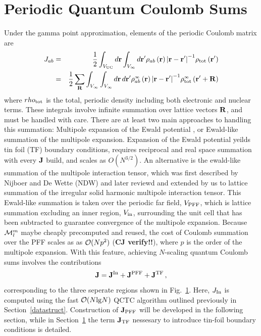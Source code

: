 \commentoutA{\documentclass[prb,aps,twocolumn,showpacs,twocolumngrid,superbib]{revtex4}}
\begin{document}
\section{Periodic Quantum Coulomb Sums}

Under the gamma point approximation, elements of the periodic Coulomb matrix are 
\begin{eqnarray}
J_{ab}&=&\frac{1}{2}\int _{V_{\rm UC}} d{\mathbf{r}}  \int _{V_{\infty }} 
d{\mathbf{r}'}{\rho _{ab}\left( {\mathbf{r}}\right) {\left| \mathbf{r}-\mathbf{r}'\right| }^{-1}
\rho_{\rm tot}\left( \mathbf{r}'\right) } \\
&=& \frac{1}{2}\sum _{\mathbf{R}}\int _{V_{\infty }}\int _{V_{\infty }} 
d{\mathbf{r}}\, d{\mathbf{r}'}{\rho _{ab}^{\scriptscriptstyle \infty}\left( {\mathbf{r}}\right)  
{\left| \mathbf{r}-\mathbf{r}'\right| }^{-1} \rho^{\scriptscriptstyle \infty}_{\rm tot}\left( {\mathbf{r}'}+{\mathbf{R}}\right) }
\nonumber 
\end{eqnarray}
where $rho_{\rm tot}$ is the total, periodic density including both electronic and nuclear terms.  These integrals
involve infinite summation over lattice vectors $\bf R$, and must be handled with care.  There are at least two
main approaches to handling this summation:  Multipole expansion of the Ewald potential \cite{},
or Ewald-like summation of the multipole expansion.    Expansion of the Ewald potential yeilds  
tin foil (TF) boundary conditions, requires reciprocal and real space summation with every $\bf J$ build, 
and scales as $O(N^{3/2})$.  An alternative is the ewald-like summation of the multipole interaction tensor,
which was first described by Nijboer and De Wette (NDW) \cite{} and later reviewd and extended by us \cite{}
to lattice summation of the irregular solid harmonic multipole interaction tensor. 
This Ewald-like summation is taken over the periodic far field, $V_{\rm PFF}$, which is lattice summation excluding 
an inner region, $V_{\rm in}$, surrounding the unit cell that has been subtracted to guarantee convergence of the 
multipole expansion.  Because ${\cal M}^{m}_l$ maybe cheaply precomputed and reused, 
the cost of Coulomb summation over the PFF scales as as ${\cal O}(N p^2)$ ({\bf CJ verify!!}), where $p$ is the order 
of the multipole expansion.  With this feature, achieving $N$-scaling quantum Coulomb sums involves the contributions
\begin{equation}
{\bf J} = {\bf J}^{\rm In} + {\bf J}^{\rm PFF} + {\bf J}^{\rm TF} \, ,
\end{equation}
corresponding to the three seperate regions shown in Fig.~\ref{}.   Here, $J_{\rm In}$ is computed using 
the fast ${\cal O}(N {\rm lg} N)$ QCTC algorithm outlined previously in Section~\ref{datastruct}. Construction of ${\bf J}_{\rm PFF}$ 
will be developed in the following section, while in Section~\ref{} the term ${\bf J}_{\rm TF}$ nessesary to 
introduce tin-foil boundary conditions is detailed.
\end{document}
